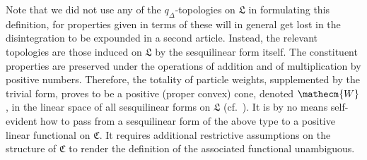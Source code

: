 \documentclass[a4paper,a4paper]{article}
\numberwithin{equation}{section}
\newcommand{\Wecm}{\mathecm{W}}
\newcommand{\Cfrak}{\mathfrak{C}}
\newcommand{\Lfrak}{\mathfrak{L}}
\theoremstyle{definition}
\theoremstyle{plain}
\theoremstyle{remark}
\newcommand{\qD}{q_\Delta}
\begin{document}
  Note that we did not use any of the $\qD$-topologies on $\Lfrak$ in
  formulating this definition, for properties given in terms of these
  will in general get lost in the disintegration to be expounded in a
  second article. Instead, the relevant topologies are those induced
  on $\Lfrak$ by the sesquilinear form itself. The constituent
  properties are preserved under the operations of addition and of
  multiplication by positive numbers. Therefore, the totality of
  particle weights, supplemented by the trivial form, proves to be a
  positive (proper convex) cone, denoted $\Wecm$, in the linear space
  of all sesquilinear forms on $\Lfrak$
  (cf.~\cite{peressini:1967,asimow/ellis:1980}). It is by no means
  self-evident how to pass from a sesquilinear form of the above type
  to a positive linear functional on $\Cfrak$. It requires additional
  restrictive assumptions on the structure of $\Cfrak$ to render the
  definition of the associated functional unambiguous.
    
\end{document}
